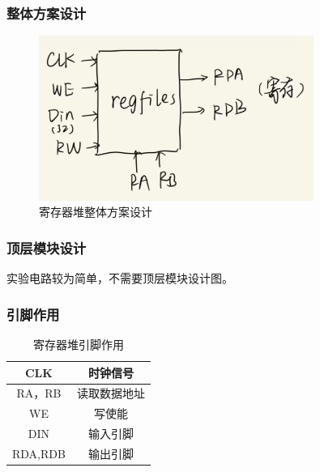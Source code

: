 \documentclass{article}
\begin{document}
    \subsubsection{整体方案设计}
    \begin{figure}[H]
    \centering
    \includegraphics[width=0.8\textwidth]{5.1.png}
    \caption{寄存器堆整体方案设计}
    \end{figure}
    
    \subsubsection{顶层模块设计}
    实验电路较为简单，不需要顶层模块设计图。
    
    \subsubsection{引脚作用}
    \begin{table}[H]    
    \centering
    \begin{tabular}{|c|c|}
        \hline
        CLK & 时钟信号 \\ \hline
        RA，RB & 读取数据地址 \\ \hline
        WE & 写使能 \\ \hline
        DIN & 输入引脚 \\ \hline
        RDA,RDB  & 输出引脚 \\ \hline
    \end{tabular}
    \caption{寄存器堆引脚作用}
    \end{table}
\end{document}
